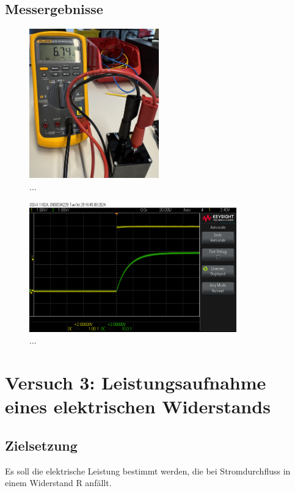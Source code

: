 \documentclass[a4paper,12pt]{article}
\begin{document}
\subsection{Messergebnisse}
\begin{figure}[H]
    \centering
    \includegraphics[width=0.5\textwidth]{../Quellen/Labor2/Fotos/IMG_3973gezoomt.jpeg}
\caption{...}
\end{figure}



\begin{figure}[H]
    \centering
    \includegraphics[width=0.8\textwidth]{../Quellen/Labor2/scope_3.png}
\caption{...}
\end{figure}





\newpage
\section{Versuch 3: Leistungsaufnahme eines elektrischen Widerstands}
\subsection{Zielsetzung}
Es soll die elektrische Leistung bestimmt werden, die bei Stromdurchfluss in
einem Widerstand R anfällt.
\end{document}
